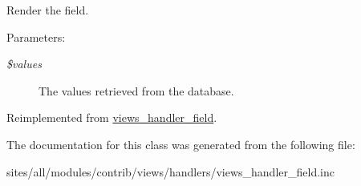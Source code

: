 Render the field.

\begin{Desc}
\item[Parameters:]
\begin{description}
\item[{\em \$values}]The values retrieved from the database. \end{description}
\end{Desc}


Reimplemented from \hyperlink{classviews__handler__field_82ff951c5e9ceb97b2eab86f880cbc1e}{views\_\-handler\_\-field}.

The documentation for this class was generated from the following file:\begin{CompactItemize}
\item 
sites/all/modules/contrib/views/handlers/views\_\-handler\_\-field.inc\end{CompactItemize}
